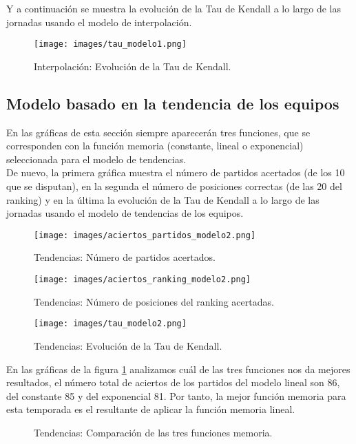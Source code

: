 Y a continuación se muestra la evolución de la Tau de Kendall a lo largo de las jornadas usando el modelo de interpolación.
\begin{figure}[H]
	\centering
	\texttt{[image: images/tau\_modelo1.png]}
	\caption{Interpolación: Evolución de la Tau de Kendall.}
\end{figure}

\subsection{Modelo basado en la tendencia de los equipos}
En las gráficas de esta sección siempre aparecerán tres funciones, que se corresponden con la función memoria (constante, lineal o exponencial) seleccionada para el modelo de tendencias.\\

De nuevo, la primera gráfica muestra el número de partidos acertados (de los 10 que se disputan), en la segunda el número de posiciones correctas (de las 20 del ranking) y en la última la evolución de la Tau de Kendall a lo largo de las jornadas usando el modelo de tendencias de los equipos.
\begin{figure}[H]
	\centering
	\texttt{[image: images/aciertos\_partidos\_modelo2.png]}
	\caption{Tendencias: Número de partidos acertados.}
\end{figure}

\begin{figure}[H]
	\centering
	\texttt{[image: images/aciertos\_ranking\_modelo2.png]}
	\caption{Tendencias: Número de posiciones del ranking acertadas.}
\end{figure}

\begin{figure}[H]
	\centering
	\texttt{[image: images/tau\_modelo2.png]}
	\caption{Tendencias: Evolución de la Tau de Kendall.}
\end{figure}
En las gráficas de la figura \ref{fig:comparacion_func} analizamos cuál de las tres funciones nos da mejores resultados, el número total de aciertos de los partidos del modelo lineal son 86, del constante 85 y del exponencial 81. Por tanto, la mejor función memoria para esta temporada es el resultante de aplicar la función memoria lineal.
\begin{figure}[H]
	\centering
	\caption{Tendencias: Comparación de las tres funciones memoria.} \label{fig:comparacion_func}
\end{figure} 

